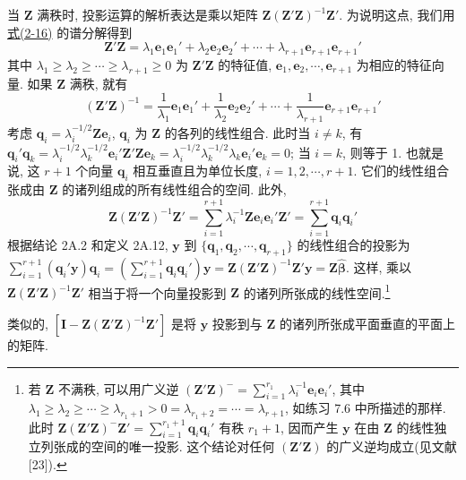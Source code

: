 当 $\mathbf{Z}$ 满秩时, 投影运算的解析表达是乘以矩阵 $\mathbf{Z}(\mathbf{Z}'\mathbf{Z})^{-1}\mathbf{Z}'$. 为说明这点, 我们用\hyperref[eq:2-16]{式(2-16)} 的谱分解得到
\[
\mathbf{Z}'\mathbf{Z}=\lambda_1\mathbf{e}_1\mathbf{e}_1'+\lambda_2\mathbf{e}_2\mathbf{e}_2'+\cdots+\lambda_{r+1}\mathbf{e}_{r+1}\mathbf{e}_{r+1}'
\]
其中 $\lambda_1\geq\lambda_2\geq\cdots\geq\lambda_{r+1}\geq 0$ 为 $\mathbf{Z}'\mathbf{Z}$ 的特征值, $\mathbf{e}_1,\mathbf{e}_2,\cdots,\mathbf{e}_{r+1}$ 为相应的特征向量. 如果 $\mathbf{Z}$ 满秩, 就有
\[
(\mathbf{Z}'\mathbf{Z})^{-1}=\frac{1}{\lambda_1}\mathbf{e}_1\mathbf{e}_1'+\frac{1}{\lambda_2}\mathbf{e}_2\mathbf{e}_2'+\cdots+\frac{1}{\lambda_{r+1}}\mathbf{e}_{r+1}\mathbf{e}_{r+1}'
\]
考虑 $\mathbf{q}_i=\lambda_i^{-1/2}\mathbf{Z}\mathbf{e}_i$, $\mathbf{q}_i$ 为 $\mathbf{Z}$ 的各列的线性组合. 此时当 $i\neq k$, 有 $\mathbf{q}_i'\mathbf{q}_k=\lambda_i^{-1/2}\lambda_k^{-1/2}\mathbf{e}_i'\mathbf{Z}'\mathbf{Z}\mathbf{e}_k=\lambda_i^{-1/2}\lambda_k^{-1/2}\lambda_k\mathbf{e}_i'\mathbf{e}_k=0$; 当 $i=k$, 则等于 1. 也就是说, 这 $r+1$ 个向量 $\mathbf{q}_i$ 相互垂直且为单位长度, $i=1,2,\cdots,r+1$. 它们的线性组合张成由 $\mathbf{Z}$ 的诸列组成的所有线性组合的空间. 此外,
\[
\mathbf{Z}(\mathbf{Z}'\mathbf{Z})^{-1}\mathbf{Z}'=\sum_{i=1}^{r+1}\lambda_i^{-1}\mathbf{Z}\mathbf{e}_i\mathbf{e}_i'\mathbf{Z}'=\sum_{i=1}^{r+1}\mathbf{q}_i\mathbf{q}_i'
\]
根据结论 2A.2 和定义 2A.12, $\mathbf{y}$ 到 $\{\mathbf{q}_1,\mathbf{q}_2,\cdots,\mathbf{q}_{r+1}\}$ 的线性组合的投影为 $\sum\limits_{i=1}^{r+1}(\mathbf{q}_i'\mathbf{y})\mathbf{q}_i=\left(\sum\limits_{i=1}^{r+1}\mathbf{q}_i\mathbf{q}_i'\right)\mathbf{y}=\mathbf{Z}(\mathbf{Z}'\mathbf{Z})^{-1}\mathbf{Z}'\mathbf{y}=\mathbf{Z}\hat{\boldsymbol{\beta}}$. 这样, 乘以 $\mathbf{Z}(\mathbf{Z}'\mathbf{Z})^{-1}\mathbf{Z}'$ 相当于将一个向量投影到 $\mathbf{Z}$ 的诸列所张成的线性空间.\footnote{{\footnotesize 若 $\mathbf{Z}$ 不满秩, 可以用广义逆 $(\mathbf{Z}'\mathbf{Z})^-=\sum\limits_{i=1}^{r_1}\lambda_i^{-1}\mathbf{e}_i\mathbf{e}_i'$, 其中 $\lambda_1\geq\lambda_2\geq\cdots\geq\lambda_{r_1+1}>0=\lambda_{r_1+2}=\cdots=\lambda_{r+1}$, 如练习 7.6 中所描述的那样. 此时 $\mathbf{Z}(\mathbf{Z}'\mathbf{Z})^-\mathbf{Z}'=\sum\limits_{i=1}^{r_1+1}\mathbf{q}_i\mathbf{q}_i'$ 有秩 $r_1+1$, 因而产生 $\mathbf{y}$ 在由 $\mathbf{Z}$ 的线性独立列张成的空间的唯一投影. 这个结论对任何 $(\mathbf{Z}'\mathbf{Z})$ 的广义逆均成立(见文献[23]).}}

类似的, $[\mathbf{I}-\mathbf{Z}(\mathbf{Z}'\mathbf{Z})^{-1}\mathbf{Z}']$ 是将 $\mathbf{y}$ 投影到与 $\mathbf{Z}$ 的诸列所张成平面垂直的平面上的矩阵.
